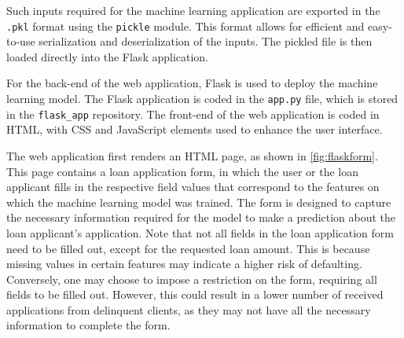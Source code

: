 Such inputs required for the machine learning application are exported in the \lstinline{.pkl} format using the \lstinline{pickle} module. This format allows for efficient and easy-to-use serialization and deserialization of the inputs. The pickled file is then loaded directly into the Flask application.

For the back-end of the web application, Flask is used to deploy the machine learning model. The Flask application is coded in the \lstinline{app.py} file, which is stored in the \lstinline{flask_app} repository. The front-end of the web application is coded in HTML, with CSS and JavaScript elements used to enhance the user interface.

The web application first renders an HTML page, as shown in \autoref{fig:flaskform}.
This page contains a loan application form, in which the user or the loan applicant fills in the respective field values that correspond to the features on which the machine learning model was trained.
The form is designed to capture the necessary information required for the model to make a prediction about the loan applicant's application.
Note that not all fields in the loan application form need to be filled out, except for the requested loan amount. This is because missing values in certain features may indicate a higher risk of defaulting. Conversely, one may choose to impose a restriction on the form, requiring all fields to be filled out. However, this could result in a lower number of received applications from delinquent clients, as they may not have all the necessary information to complete the form.

